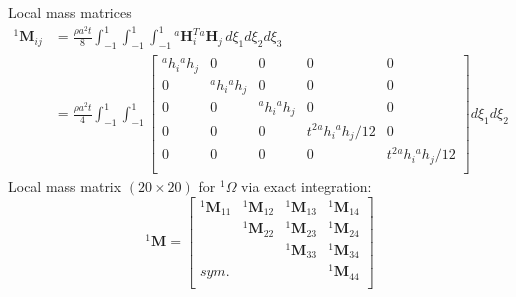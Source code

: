 \documentclass[aspectratio=169]{beamer}
\begin{document}
\begin{frame}{Local mass matrices}
  \begin{align*}
    {}^1\mathbf M_{ij} & =\frac{\rho a^2t}{8}\int_{-1}^1\int_{-1}^1\int_{-1}^1 {}^a\mathbf H_i^T {}^a\mathbf H_j\, d\xi_1d\xi_2d\xi_3                                                                                        \\
                       & =\frac{\rho a^2t}{4}\int_{-1}^1\int_{-1}^1\begin{bmatrix}
                                                                     {}^ah_i{}^ah_j & 0              & 0 & 0                    & 0                    \\
                                                                     0              & {}^ah_i{}^ah_j & 0 & 0                    & 0                    \\ 0 & 0 & {}^ah_i{}^ah_j & 0                    & 0                    \\
                                                                     0              & 0              & 0 & t^2{}^ah_i{}^ah_j/12 & 0                    \\
                                                                     0              & 0              & 0 & 0                    & t^2{}^ah_i{}^ah_j/12 \\
                                                                   \end{bmatrix}d\xi_1d\xi_2
  \end{align*}
  Local mass matrix $(20\times 20)$ for ${}^1\Omega$ via exact integration:
  $${}^1\mathbf M= \begin{bmatrix}
      {}^1\mathbf M_{11} & {}^1\mathbf M_{12} & {}^1\mathbf M_{13} & {}^1\mathbf M_{14} \\
                         & {}^1\mathbf M_{22} & {}^1\mathbf M_{23} & {}^1\mathbf M_{24} \\
                         &                    & {}^1\mathbf M_{33} & {}^1\mathbf M_{34} \\
      sym.               &                    &                    & {}^1\mathbf M_{44} \\
    \end{bmatrix}$$
\end{frame}
\end{document}
